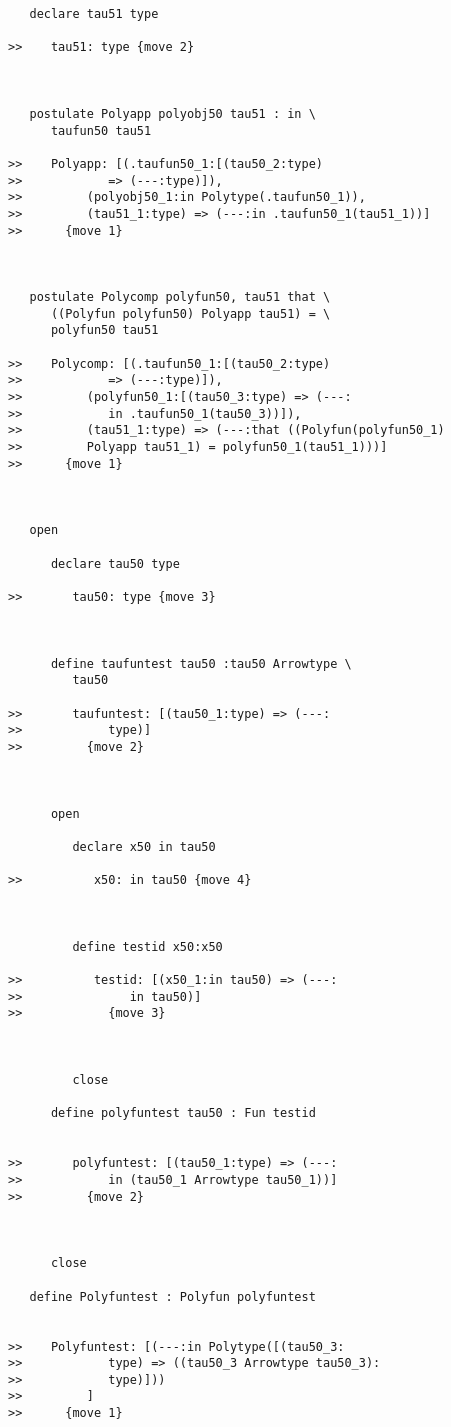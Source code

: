 \documentclass[12pt]{article}
\begin{document}
\begin{verbatim}
   declare tau51 type

>>    tau51: type {move 2}



   postulate Polyapp polyobj50 tau51 : in \
      taufun50 tau51

>>    Polyapp: [(.taufun50_1:[(tau50_2:type)
>>            => (---:type)]),
>>         (polyobj50_1:in Polytype(.taufun50_1)),
>>         (tau51_1:type) => (---:in .taufun50_1(tau51_1))]
>>      {move 1}



   postulate Polycomp polyfun50, tau51 that \
      ((Polyfun polyfun50) Polyapp tau51) = \
      polyfun50 tau51

>>    Polycomp: [(.taufun50_1:[(tau50_2:type)
>>            => (---:type)]),
>>         (polyfun50_1:[(tau50_3:type) => (---:
>>            in .taufun50_1(tau50_3))]),
>>         (tau51_1:type) => (---:that ((Polyfun(polyfun50_1)
>>         Polyapp tau51_1) = polyfun50_1(tau51_1)))]
>>      {move 1}



   open

      declare tau50 type

>>       tau50: type {move 3}



      define taufuntest tau50 :tau50 Arrowtype \
         tau50

>>       taufuntest: [(tau50_1:type) => (---:
>>            type)]
>>         {move 2}



      open

         declare x50 in tau50

>>          x50: in tau50 {move 4}



         define testid x50:x50

>>          testid: [(x50_1:in tau50) => (---:
>>               in tau50)]
>>            {move 3}



         close

      define polyfuntest tau50 : Fun testid


>>       polyfuntest: [(tau50_1:type) => (---:
>>            in (tau50_1 Arrowtype tau50_1))]
>>         {move 2}



      close

   define Polyfuntest : Polyfun polyfuntest


>>    Polyfuntest: [(---:in Polytype([(tau50_3:
>>            type) => ((tau50_3 Arrowtype tau50_3):
>>            type)]))
>>         ]
>>      {move 1}




\end{verbatim}
\end{document}

